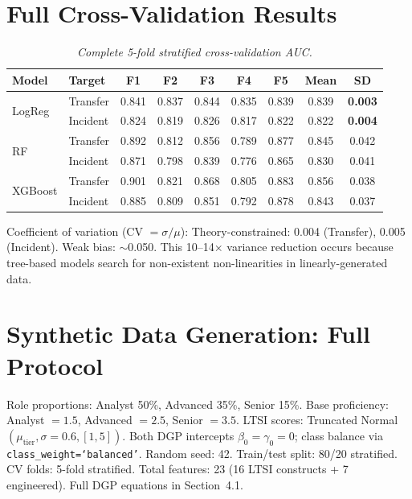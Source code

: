 \documentclass[11pt,a4paper]{article}
\begin{document}
\section{Full Cross-Validation Results}
\label{app:cv}

\begin{table}[H]
\centering
\caption{\textit{Complete 5-fold stratified cross-validation AUC.}}
\begin{tabular}{llccccccc}
\toprule
\textbf{Model} & \textbf{Target} & \textbf{F1} & \textbf{F2} & \textbf{F3} & \textbf{F4} & \textbf{F5} & \textbf{Mean} & \textbf{SD}\\
\midrule
\multirow{2}{*}{LogReg} & Transfer & 0.841 & 0.837 & 0.844 & 0.835 & 0.839 & 0.839 & \textbf{0.003}\\
 & Incident & 0.824 & 0.819 & 0.826 & 0.817 & 0.822 & 0.822 & \textbf{0.004}\\
\midrule
\multirow{2}{*}{RF} & Transfer & 0.892 & 0.812 & 0.856 & 0.789 & 0.877 & 0.845 & 0.042\\
 & Incident & 0.871 & 0.798 & 0.839 & 0.776 & 0.865 & 0.830 & 0.041\\
\midrule
\multirow{2}{*}{XGBoost} & Transfer & 0.901 & 0.821 & 0.868 & 0.805 & 0.883 & 0.856 & 0.038\\
 & Incident & 0.885 & 0.809 & 0.851 & 0.792 & 0.878 & 0.843 & 0.037\\
\bottomrule
\end{tabular}
\end{table}

\noindent Coefficient of variation (CV $= \sigma/\mu$): Theory-constrained: 0.004 (Transfer), 0.005 (Incident). Weak bias: $\sim$0.050. This 10--14$\times$ variance reduction occurs because tree-based models search for non-existent non-linearities in linearly-generated data.

\section{Synthetic Data Generation: Full Protocol}
\label{app:datagen}

Role proportions: Analyst 50\%, Advanced 35\%, Senior 15\%. Base proficiency: Analyst $=1.5$, Advanced $=2.5$, Senior $=3.5$. LTSI scores: Truncated Normal$(\mu_\text{tier}, \sigma=0.6, [1,5])$. Both DGP intercepts $\beta_0 = \gamma_0 = 0$; class balance via \texttt{class\_weight=`balanced'}. Random seed: 42. Train/test split: 80/20 stratified. CV folds: 5-fold stratified. Total features: 23 (16 LTSI constructs + 7 engineered). Full DGP equations in Section~4.1.
\end{document}
